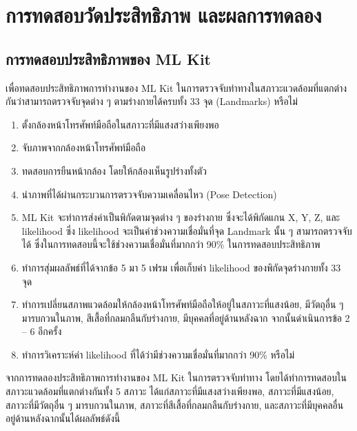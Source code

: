 \chapter{การทดสอบวัดประสิทธิภาพ และผลการทดลอง}

\section{การทดสอบประสิทธิภาพของ ML Kit}

เพื่อทดสอบประสิทธิภาพการทำงานของ ML Kit ในการตรวจจับท่าทางในสภาวะแวดล้อมที่แตกต่างกันว่าสามารถตรวจจับจุดต่าง ๆ ตามร่างกายได้ครบทั้ง 33 จุด (Landmarks) หรือไม่

\begin{enumerate}
	\item ตั้งกล้องหน้าโทรศัพท์มือถือในสภาวะที่มีแสงสว่างเพียงพอ
	\item จับภาพจากกล้องหน้าโทรศัพท์มือถือ
	\item ทดสอบการยืนหน้ากล้อง โดยให้กล้องเห็นรูปร่างทั้งตัว
	\item นำภาพที่ได้ผ่านกระบวนการตรวจจับความเคลื่อนไหว (Pose Detection)
	\item ML Kit จะทำการส่งค่าเป็นพิกัดตามจุดต่าง ๆ ของร่างกาย ซึ่งจะได้พิกัดแกน X, Y, Z, และ likelihood ซึ่ง likelihood จะเป็นค่าช่วงความเชื่อมั่นที่จุด Landmark นั้น ๆ สามารถตรวจจับได้ ซึ่งในการทดสอบนี้จะใช้ช่วงความเชื่อมั่นที่มากกว่า 90\% ในการทดสอบประสิทธิภาพ
	\item ทำการสุ่มผลลัพธ์ที่ได้จากข้อ 5 มา 5 เฟรม เพื่อเก็บค่า likelihood ของพิกัดจุดร่างกายทั้ง 33 จุด
	\item ทำการเปลี่ยนสภาพแวดล้อมให้กล้องหน้าโทรศัพท์มือถือให้อยู่ในสภาวะที่แสงน้อย, มีวัตถุอื่น ๆ มารบกวนในภาพ, สีเสื้อที่กลมกลืนกับร่างกาย, มีบุคคลที่อยู่ด้านหลังฉาก จากนั้นดำเนินการข้อ 2 – 6 อีกครั้ง
	\item ทำการวิเคราะห์ค่า likelihood ที่ได้ว่ามีช่วงความเชื่อมั่นที่มากกว่า 90\% หรือไม่
\end{enumerate}

จากการทดลองประสิทธิภาพการทำงานของ ML Kit ในการตรวจจับท่าทาง โดยได้ทำการทดสอบในสภาวะแวดล้อมที่แตกต่างกันทั้ง 5 สภาวะ ได้แก่สภาวะที่มีแสงสว่างเพียงพอ, สภาวะที่มีแสงน้อย, สภาวะที่มีวัตถุอื่น ๆ มารบกวนในภาพ, สภาวะที่สีเสื้อที่กลมกลืนกับร่างกาย, และสภาวะที่มีบุคคลอื่นอยู่ด้านหลังฉากนั้นได้ผลลัพธ์ดังนี้
